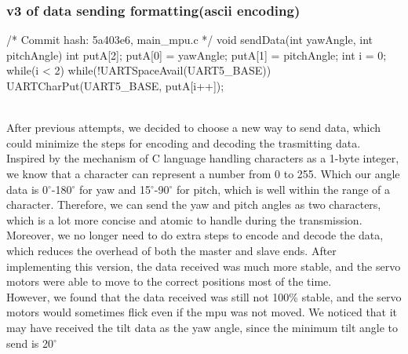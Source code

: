 \documentclass[12pt, a4paper]{article}
\begin{document}
\subsubsection{v3 of data sending formatting(ascii encoding)}\text{}
\begin{code}
/* Commit hash: 5a403e6, main_mpu.c */
void sendData(int yawAngle, int pitchAngle) {
    int putA[2];
    putA[0] = yawAngle;
    putA[1] = pitchAngle;
    int i = 0;
    while(i < 2) {
        while(!UARTSpaceAvail(UART5_BASE)) {}
        UARTCharPut(UART5_BASE, putA[i++]);
    }
}
\end{code}\text{}\\
After previous attempts, we decided to choose a new way to send data, which could minimize the steps for encoding and decoding the trasmitting data.
Inspired by the mechanism of C language handling characters as a 1-byte integer, we know that a character can represent a number from 0 to 255.
Which our angle data is 0$^\circ$-180$^\circ$ for yaw and 15$^\circ$-90$^\circ$ for pitch, which is well within the range of a character.
Therefore, we can send the yaw and pitch angles as two characters, which is a lot more concise and atomic to handle during the transmission.
Moreover, we no longer need to do extra steps to encode and decode the data, which reduces the overhead of both the master and slave ends.
After implementing this version, the data received was much more stable, and the servo motors were able to move to the correct positions most of the time.
\\However, we found that the data received was still not 100\% stable, and the servo motors would sometimes flick even if the mpu was not moved.
We noticed that it may have received the tilt data as the yaw angle, since the minimum tilt angle to send is 20$^\circ$
\end{document}
